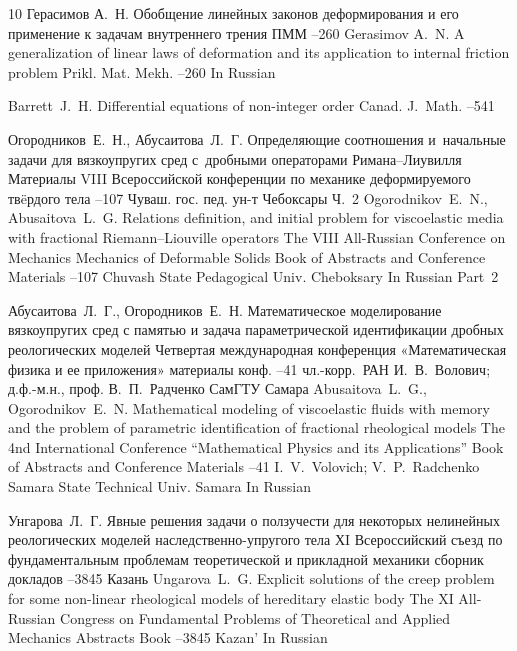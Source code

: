 \begin{thebibliography}{10}
\by Герасимов А.~Н.
\paper Обобщение линейных законов деформирования и его применение к задачам внутреннего трения
\jour ПММ
--260
\misctransl
\by Gerasimov A.~N.
\paper A generalization of linear laws of deformation and its application to internal friction problem
\jour Prikl. Mat. Mekh.
--260
\lang In Russian


\by Barrett~J.~H.
\paper Differential equations of non-integer order
\jour Canad. J.~Math.
--541

\by Огородников~Е.~Н., Абусаитова~Л.~Г.
\paper Определяющие соотношения и~начальные задачи для вязкоупругих сред с~дробными операторами Римана--Лиувилля
\inbook Материалы VIII Всероссийской конференции по механике деформируемого тв\"eрдого тела
--107
\publ Чуваш. гос. пед. ун-т
\publaddr Чебоксары
\issueinfo Ч.~2
\misctransl
\by Ogorodnikov~E.~N., Abusaitova~L.~G.
\paper Relations definition, and initial problem for viscoelastic media with fractional Riemann--Liouville operators
\inbook The VIII All-Russian Conference on Mechanics Mechanics of Deformable Solids
\bookinfo Book of Abstracts and Conference Materials
--107
\publ Chuvash State Pedagogical Univ.
\publaddr Cheboksary
\lang In Russian
\issueinfo Part~2


\by Абусаитова~Л.~Г., Огородников~Е.~Н.
\paper Математическое моделирование вязкоупругих сред с памятью и задача параметрической идентификации дробных реологических моделей
\inbook Четвертая международная конференция «Математическая физика и ее приложения»
\bookinfo материалы конф.
--41
\eds чл.-корр.~РАН И.~В.~Волович; д.ф.-м.н., проф. В.~П.~Радченко
\publ СамГТУ
\publaddr Самара
\misctransl
\by Abusaitova~L.~G., Ogorodnikov~E.~N.
\paper Mathematical modeling of viscoelastic fluids with memory and the problem of parametric identification of fractional rheological models
\inbook The 4nd International Conference ``Mathematical Physics and its Applications''
\bookinfo Book of Abstracts and Conference Materials
--41
\eds I.~V.~Volovich; V.~P.~Radchenko
\publ Samara State Technical Univ.
\publaddr Samara
\lang In Russian


\by Унгарова~Л.~Г.
\paper Явные решения задачи о ползучести для некоторых нелинейных реологических моделей наследственно-упругого тела
\inbook ХI Всероссийский съезд по фундаментальным проблемам теоретической и прикладной механики
\bookinfo сборник докладов
--3845
\publaddr Казань
\misctransl
\by Ungarova~L.~G.
\paper Explicit solutions of the creep problem for some non-linear rheological models of hereditary elastic body
\inbook The XI All-Russian Congress on Fundamental Problems of Theoretical and Applied Mechanics
\bookinfo Abstracts Book
--3845
\publaddr Kazan'
\lang In Russian


\end{thebibliography}
